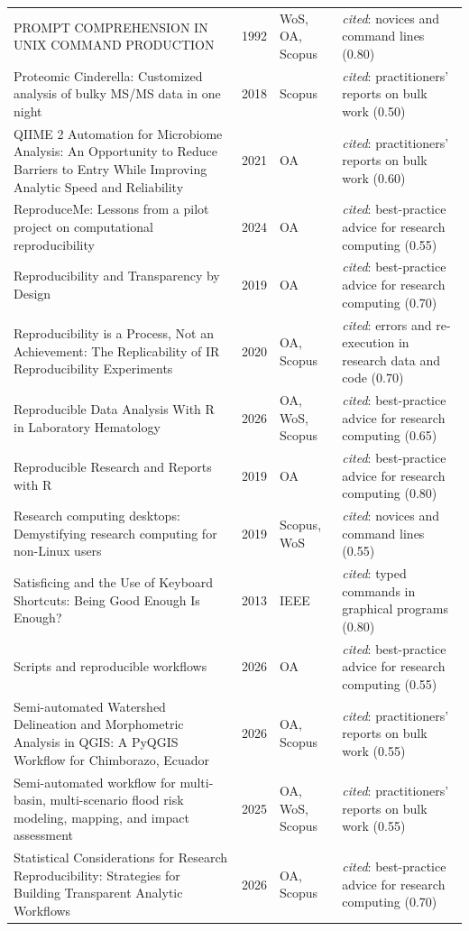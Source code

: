 \begin{longtable}{@{}%
  >{\raggedright\arraybackslash}p{}c%
  >{\raggedright\arraybackslash}p{}%
  >{\raggedright\arraybackslash}p{}@{}}
PROMPT COMPREHENSION IN UNIX COMMAND PRODUCTION & 1992 & WoS, OA, Scopus & \emph{cited}: novices and command lines (0.80) \\
Proteomic Cinderella: Customized analysis of bulky MS/MS data in one night & 2018 & Scopus & \emph{cited}: practitioners' reports on bulk work (0.50) \\
QIIME 2 Automation for Microbiome Analysis: An Opportunity to Reduce Barriers to Entry While Improving Analytic Speed and Reliability & 2021 & OA & \emph{cited}: practitioners' reports on bulk work (0.60) \\
ReproduceMe: Lessons from a pilot project on computational reproducibility & 2024 & OA & \emph{cited}: best-practice advice for research computing (0.55) \\
Reproducibility and Transparency by Design & 2019 & OA & \emph{cited}: best-practice advice for research computing (0.70) \\
Reproducibility is a Process, Not an Achievement: The Replicability of IR Reproducibility Experiments & 2020 & OA, Scopus & \emph{cited}: errors and re-execution in research data and code (0.70) \\
Reproducible Data Analysis With R in Laboratory Hematology & 2026 & OA, WoS, Scopus & \emph{cited}: best-practice advice for research computing (0.65) \\
Reproducible Research and Reports with R & 2019 & OA & \emph{cited}: best-practice advice for research computing (0.80) \\
Research computing desktops: Demystifying research computing for non-Linux users & 2019 & Scopus, WoS & \emph{cited}: novices and command lines (0.55) \\
Satisficing and the Use of Keyboard Shortcuts: Being Good Enough Is Enough? & 2013 & IEEE & \emph{cited}: typed commands in graphical programs (0.80) \\
Scripts and reproducible workflows & 2026 & OA & \emph{cited}: best-practice advice for research computing (0.55) \\
Semi-automated Watershed Delineation and Morphometric Analysis in QGIS: A PyQGIS Workflow for Chimborazo, Ecuador & 2026 & OA, Scopus & \emph{cited}: practitioners' reports on bulk work (0.55) \\
Semi-automated workflow for multi-basin, multi-scenario flood risk modeling, mapping, and impact assessment & 2025 & OA, WoS, Scopus & \emph{cited}: practitioners' reports on bulk work (0.55) \\
Statistical Considerations for Research Reproducibility: Strategies for Building Transparent Analytic Workflows & 2026 & OA, Scopus & \emph{cited}: best-practice advice for research computing (0.70) \\

\end{longtable}
